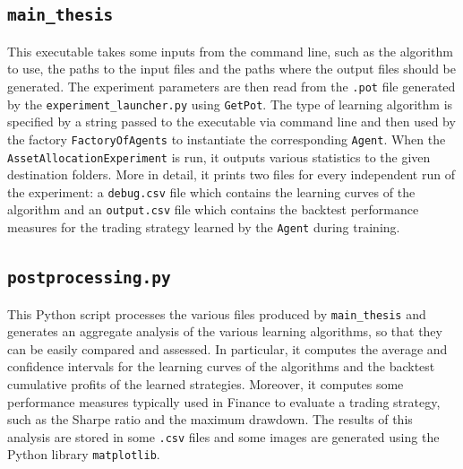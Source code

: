 \subsection{\lstinline{main_thesis}} This executable takes some inputs from the command line, such as the algorithm to use, the paths to the input files and the paths where the output files should be generated. The experiment parameters are then read from the \lstinline{.pot} file generated by the \lstinline{experiment_launcher.py} using \lstinline{GetPot}. The type of learning algorithm is specified by a string passed to the executable via command line and then used by the factory \lstinline{FactoryOfAgents} to instantiate the corresponding \lstinline{Agent}. When the \lstinline{AssetAllocationExperiment} is run, it outputs various statistics to the given destination folders. More in detail, it prints two files for every independent run of the experiment: a \lstinline{debug.csv} file which contains the learning curves of the algorithm and an \lstinline{output.csv} file which contains the backtest performance measures for the trading strategy learned by the \lstinline{Agent} during training.   

\subsection{\lstinline{postprocessing.py}} This Python script processes the various files produced by \lstinline{main_thesis} and generates an aggregate analysis of the various learning algorithms, so that they can be easily compared and assessed. In particular, it computes the average and confidence intervals for the learning curves of the algorithms and the backtest cumulative profits of the learned strategies. Moreover, it computes some performance measures typically used in Finance to evaluate a trading strategy, such as the Sharpe ratio and the maximum drawdown. The results of this analysis are stored in some \lstinline{.csv} files and some images are generated using the Python library \lstinline{matplotlib}. 



